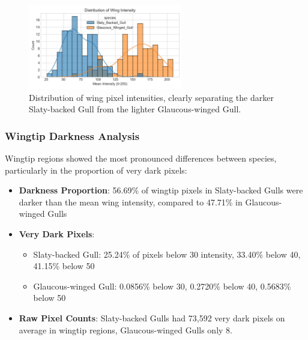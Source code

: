 \documentclass[a4paper,12pt]{report}
\begin{document}
\begin{figure}[H]
    \centering
    \includegraphics[width=0.6\textwidth]{images/REPORT_IMAGES_INTENSITY/I2/ditribution.png}
    \caption{Distribution of wing pixel intensities, clearly separating the darker Slaty-backed Gull from the lighter Glaucous-winged Gull.}
    \label{fig:wing_distribution}
\end{figure}

\subsubsection{Wingtip Darkness Analysis}
Wingtip regions showed the most pronounced differences between species, particularly in the proportion of very dark pixels:

\begin{itemize}
    \item \textbf{Darkness Proportion}: 56.69\% of wingtip pixels in Slaty-backed Gulls were darker than the mean wing intensity, compared to 47.71\% in Glaucous-winged Gulls
    \item \textbf{Very Dark Pixels}:
    \begin{itemize}
        \item Slaty-backed Gull: 25.24\% of pixels below 30 intensity, 33.40\% below 40, 41.15\% below 50
        \item Glaucous-winged Gull: 0.0856\% below 30, 0.2720\% below 40, 0.5683\% below 50
    \end{itemize}
    \item \textbf{Raw Pixel Counts}: Slaty-backed Gulls had 73,592 very dark pixels on average in wingtip regions, Glaucous-winged Gulls only 8.
\end{itemize}
\end{document}
